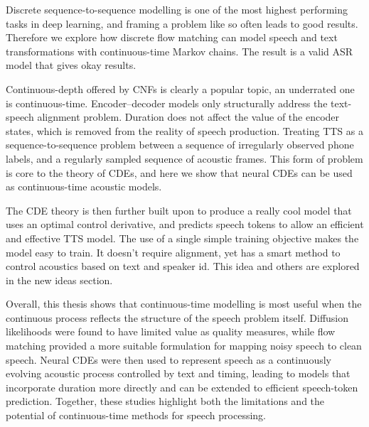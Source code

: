 Discrete sequence-to-sequence modelling is one of the most highest performing tasks in deep learning, and framing a problem like so often leads to good results. Therefore we explore how discrete flow matching can model speech and text transformations with continuous-time Markov chains. The result is a valid ASR model that gives okay results.

Continuous-depth offered by CNFs is clearly a popular topic, an underrated one is continuous-time. Encoder--decoder models only structurally address the text-speech alignment problem. Duration does not affect the value of the encoder states, which is removed from the reality of speech production. Treating TTS as a sequence-to-sequence problem between a sequence of irregularly observed phone labels, and a regularly sampled sequence of acoustic frames. This form of problem is core to the theory of CDEs, and here we show that neural CDEs can be used as continuous-time acoustic models.

The CDE theory is then further built upon to produce a really cool model that uses an optimal control derivative, and predicts speech tokens to allow an efficient and effective TTS model. The use of a single simple training objective makes the model easy to train. It doesn't require alignment, yet has a smart method to control acoustics based on text and speaker id. This idea and others are explored in the new ideas section.

Overall, this thesis shows that continuous-time modelling is most useful when the continuous process reflects the structure of the speech problem itself. Diffusion likelihoods were found to have limited value as quality measures, while flow matching provided a more suitable formulation for mapping noisy speech to clean speech. Neural CDEs were then used to represent speech as a continuously evolving acoustic process controlled by text and timing, leading to models that incorporate duration more directly and can be extended to efficient speech-token prediction. Together, these studies highlight both the limitations and the potential of continuous-time methods for speech processing.



\clearpage

